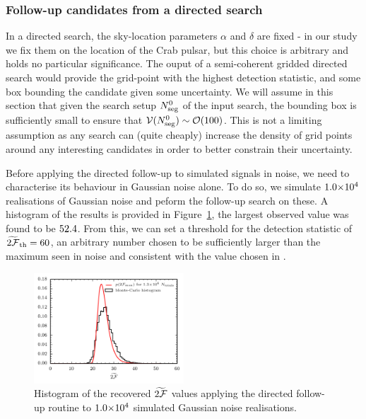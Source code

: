 \documentclass[aps, prd, twocolumn, superscriptaddress, floatfix, showpacs, nofootinbib, longbibliography]{revtex4-1}
\begin{document}
\subsubsection{Follow-up candidates from a directed search}
\label{sec_directed_follow_up}

In a directed search, the sky-location parameters $\alpha$ and $\delta$ are
fixed - in our study we fix them on the location of the Crab pulsar, but this
choice is arbitrary and holds no particular significance. The ouput of a
semi-coherent gridded directed search would provide the grid-point with the
highest detection statistic, and some box bounding the candidate given some
uncertainty. We will assume in this section that given the search setup
$N_{\rm seg}^{0}$ of the input search, the bounding box is sufficiently small to
ensure that $\mathcal{V}(N_{\rm seg}^0)\sim \mathcal{O}(100)$. This is not a limiting
assumption as any search can (quite cheaply) increase the density of grid
points around any interesting candidates in order to better constrain their
uncertainty.

Before applying the directed follow-up to simulated signals in noise, we need
to characterise its behaviour in Gaussian noise alone. To do so, we simulate
$1.0{\times}10^{4}$ realisations of Gaussian noise and peform the follow-up
search on these. A histogram of the results is provided in
Figure~\ref{fig_hist_DirectedMCNoiseOnly}, the largest observed value was
found to be $52.4$. From this, we can set a threshold
for the detection statistic of $\widetilde{2{\mathcal{F}}}_{\rm th} = 60$, an arbitrary
number chosen to be sufficiently larger than the maximum seen in noise and
consistent with the value chosen in \citet{shaltev2013}.
\begin{figure}[htb]
\centering
\includegraphics[width=0.5\textwidth]{directed_noise_twoF_histogram}
\caption{Histogram of the recovered $\widetilde{2{\mathcal{F}}}$ values applying the
directed follow-up routine to $1.0{\times}10^{4}$ simulated Gaussian noise
realisations.}
\label{fig_hist_DirectedMCNoiseOnly}
\end{figure}
\end{document}
